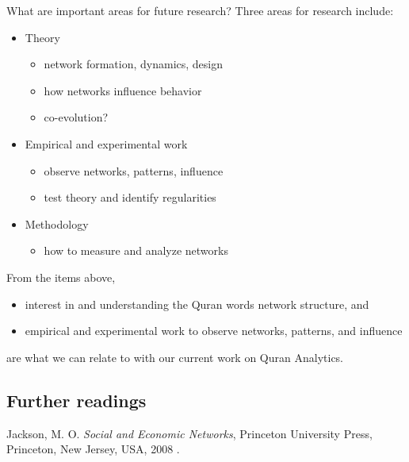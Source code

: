 \documentclass[
]{article}
\providecommand{\tightlist}{%
  \setlength{\itemsep}{0pt}\setlength{\parskip}{0pt}}
\begin{document}
What are important areas for future research? Three areas for research include:

\begin{itemize}
\tightlist
\item
  Theory

  \begin{itemize}
  \tightlist
  \item
    network formation, dynamics, design
  \item
    how networks influence behavior
  \item
    co-evolution?
  \end{itemize}
\item
  Empirical and experimental work

  \begin{itemize}
  \tightlist
  \item
    observe networks, patterns, influence\\
  \item
    test theory and identify regularities\\
  \end{itemize}
\item
  Methodology

  \begin{itemize}
  \tightlist
  \item
    how to measure and analyze networks
  \end{itemize}
\end{itemize}

From the items above,

\begin{itemize}
\tightlist
\item
  interest in and understanding the Quran words network structure, and
\item
  empirical and experimental work to observe networks, patterns, and influence
\end{itemize}

are what we can relate to with our current work on Quran Analytics.

\hypertarget{further-readings-5}{%
\subsection{Further readings}\label{further-readings-5}}

Jackson, M. O. \emph{Social and Economic Networks}, Princeton University Press, Princeton, New Jersey, USA, 2008 \citep{jackson2008}.
\end{document}
